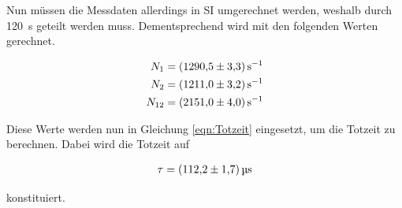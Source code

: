 \noindent Nun müssen die Messdaten allerdings in SI umgerechnet werden, weshalb durch \qty{120}{\second} geteilt werden muss. 
Dementsprechend wird mit den folgenden Werten gerechnet.

\begin{align*}
    N_{1 } &= \qty[per-mode=reciprocal]{1290.5\pm3.3}{\per\second}    \\
    N_{2 } &= \qty[per-mode=reciprocal]{1211.0\pm3.2}{\per\second}    \\
    N_{12} &= \qty[per-mode=reciprocal]{2151.0\pm4.0}{\per\second}    \\
\end{align*}

\noindent Diese Werte werden nun in Gleichung \eqref{eqn:Totzeit} eingesetzt, um die Totzeit zu berechnen. Dabei wird die Totzeit auf

\begin{align*}
    \tau = \qty{112.2\pm1.7}{\micro \second}
\end{align*}

\noindent konstituiert.


%
